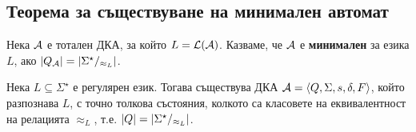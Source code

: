 \subsection{Теорема за съществуване на минимален автомат}

\begin{dfn}
  Нека $\mathcal{A}$ е тотален ДКА, за който $L = \mathcal{L}(\mathcal{A})$.
  Казваме, че $\mathcal{A}$ е {\bf минимален} за езика $L$, ако $\lvert{Q_{\mathcal{A}}}\rvert = \lvert{\Sigma^\star/_{\approx_L}}\rvert$.
\end{dfn}

\begin{thm}
  \label{th:myhill-nerode}
  Нека $L\subseteq \Sigma^\star$ е регулярен език.
  Тогава съществува ДКА $\mathcal{A} = \langle{Q,\Sigma,s,\delta,F}\rangle$, който разпознава $L$,
  с точно толкова състояния, колкото са класовете на еквивалентност на релацията $\approx_L$,
  т.е. $\lvert{Q}\rvert = \lvert{\Sigma^\star/_{\approx_L}}\rvert$.
\end{thm}
